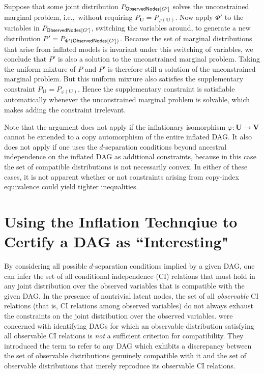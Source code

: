 {Suppose that some joint distribution $P_{{\operatorname{\mathsf{ObservedNodes}}_{}}\lbrack G'\rbrack}$ solves the unconstrained marginal problem, i.e.,~without requiring $P_{\bm{U}} = P_{\varphi(\bm{U})}$. Now apply $\Phi'$ to the variables in $P_{{\operatorname{\mathsf{ObservedNodes}}_{}}\lbrack G'\rbrack}$, switching the variables around, to generate a new distribution $P'=P_{\Phi'({\operatorname{\mathsf{ObservedNodes}}_{}}\lbrack G'\rbrack)}$. Because the set of marginal distributions that arise from inflated models is invariant under this switching of variables, we conclude that $P'$ is also a solution to the unconstrained marginal problem. Taking the uniform mixture of $P$ and $P'$ is therefore still a solution of the unconstrained marginal problem. But this uniform mixture also satisfies the supplementary constraint $P_{\bm{U}} = P_{\varphi(\bm{U})}$. Hence the supplementary constraint is satisfiable automatically whenever the unconstrained marginal problem is solvable, which makes adding the constraint irrelevant.

Note that the argument does not apply if the inflationary isomorphism $\varphi:\bm{U}\to\bm{V}$ cannot be extended to a copy automorphism of the entire inflated DAG. It also does not apply if one uses the $d$-separation conditions beyond ancestral independence  on the inflated DAG as additional constraints, because in this case the set of compatible distributions is not necessarily convex.  In either of these cases, it is not apparent whether or not constraints arising from copy-index equivalence could yield tighter inequalities. 




\section{Using the Inflation Technqiue to Certify a DAG as ``Interesting"\label{sec:interestingproof}}

By considering all possible $d$-separation conditions implied by a given DAG, one can infer the set of all conditional independence (CI) relations that must hold in any joint distribution over the observed variables that is compatible with the given DAG. In the presence of nontrivial latent nodes, the set of all  \emph{observable} CI relations (that is, CI relations among observed variables) 
do not always exhaust the constraints on the joint distribution over the observed variables. \citet{pusey2014gdag} were concerned with identifying DAGs for which an observable distribution satisfying all observable CI relations is \emph{not} a sufficient criterion for compatibility.  They introduced the term  to refer to any DAG which exhibits a discrepancy between the set of observable distributions genuinely compatible with it and the set of observable distributions that merely reproduce its observable CI relations.

}
